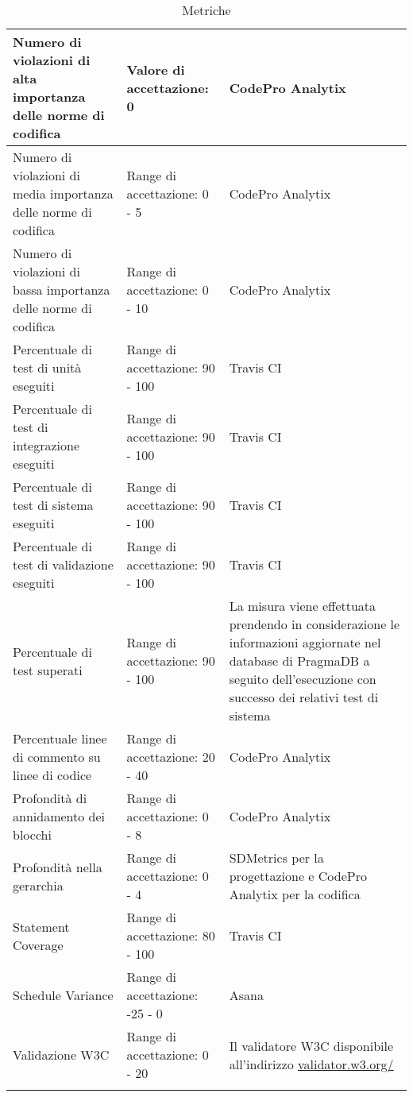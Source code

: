 \begin{longtable}{|p{}|p{}|p{}|}
	\hline 
	Numero di violazioni di alta importanza delle norme di codifica & Valore di accettazione: 0 &  CodePro Analytix \\ 
	\hline 
	Numero di violazioni di media importanza delle norme di codifica & Range di accettazione: 0 - 5 &  CodePro Analytix \\ 
	\hline 
	Numero di violazioni di bassa importanza delle norme di codifica & Range di accettazione: 0 - 10 &  CodePro Analytix \\ 
	\hline 
	Percentuale di test di unità eseguiti & Range di accettazione: 90 - 100 &  Travis CI \\ 
	\hline 
	Percentuale di test di integrazione eseguiti & Range di accettazione: 90 - 100 &  Travis CI \\ 
	\hline 
	Percentuale di test di sistema eseguiti & Range di accettazione: 90 - 100 &  Travis CI \\ 
	\hline 
	Percentuale di test di validazione eseguiti & Range di accettazione: 90 - 100 & Travis CI \\ 
	\hline 
	Percentuale di test superati & Range di accettazione: 90 - 100 & La misura viene effettuata prendendo in considerazione le informazioni aggiornate nel database di PragmaDB a seguito dell'esecuzione con successo dei relativi test di sistema \\ 
	\hline 
	Percentuale linee di commento su linee di codice & Range di accettazione: 20 - 40 &  CodePro Analytix \\ 
	\hline 
	Profondità di annidamento dei blocchi & Range di accettazione: 0 - 8 &  CodePro Analytix \\ 
	\hline 
	Profondità nella gerarchia & Range di accettazione: 0 - 4 &  SDMetrics per la progettazione e CodePro Analytix per la codifica \\ 
	\hline 
	Statement Coverage & Range di accettazione: 80 - 100 &  Travis CI \\ 
	\hline 
	Schedule Variance & Range di accettazione: -25 - 0 &  Asana \\ 
	\hline 
	Validazione W3C & Range di accettazione: 0 - 20 &  Il validatore W3C disponibile all'indirizzo \url{validator.w3.org/} \\ 
	\hline 
	\caption[Metriche]{Metriche}
	\label{tabella:metriche}
	\end{longtable}

